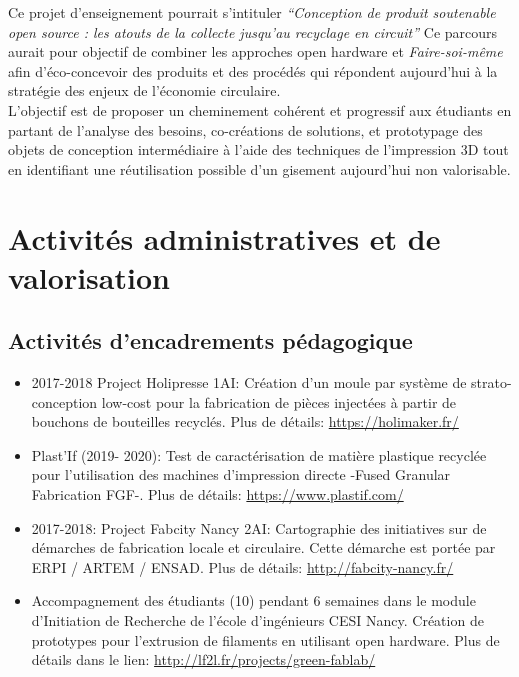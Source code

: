 \documentclass[
  11pt,
]{article}
\begin{document}
Ce projet d'enseignement pourrait s'intituler \emph{``Conception de
produit soutenable open source : les atouts de la collecte jusqu'au
recyclage en circuit''} Ce parcours aurait pour objectif de combiner les
approches open hardware et \emph{Faire-soi-même} afin d'éco-concevoir
des produits et des procédés qui répondent aujourd'hui à la stratégie
des enjeux de l'économie circulaire.\\
L'objectif est de proposer un cheminement cohérent et progressif aux
étudiants en partant de l'analyse des besoins, co-créations de
solutions, et prototypage des objets de conception intermédiaire à
l'aide des techniques de l'impression 3D tout en identifiant une
réutilisation possible d'un gisement aujourd'hui non valorisable.

\hypertarget{activituxe9s-administratives-et-de-valorisation}{%
\section{Activités administratives et de
valorisation}\label{activituxe9s-administratives-et-de-valorisation}}

\hypertarget{activituxe9s-dencadrements-puxe9dagogique}{%
\subsection{Activités d'encadrements
pédagogique}\label{activituxe9s-dencadrements-puxe9dagogique}}

\begin{itemize}
\item
  2017-2018 Project Holipresse 1AI: Création d'un moule par système de
  strato-conception low-cost pour la fabrication de pièces injectées à
  partir de bouchons de bouteilles recyclés. Plus de détails:
  \url{https://holimaker.fr/}
\item
  Plast'If (2019- 2020): Test de caractérisation de matière plastique
  recyclée pour l'utilisation des machines d'impression directe -Fused
  Granular Fabrication FGF-. Plus de détails:
  \url{https://www.plastif.com/}
\item
  2017-2018: Project Fabcity Nancy 2AI: Cartographie des initiatives sur
  de démarches de fabrication locale et circulaire. Cette démarche est
  portée par ERPI / ARTEM / ENSAD. Plus de détails:
  \url{http://fabcity-nancy.fr/}
\item
  Accompagnement des étudiants (10) pendant 6 semaines dans le module
  d'Initiation de Recherche de l'école d'ingénieurs CESI Nancy. Création
  de prototypes pour l'extrusion de filaments en utilisant open
  hardware. Plus de détails dans le lien:
  \url{http://lf2l.fr/projects/green-fablab/}
\end{itemize}
\end{document}
